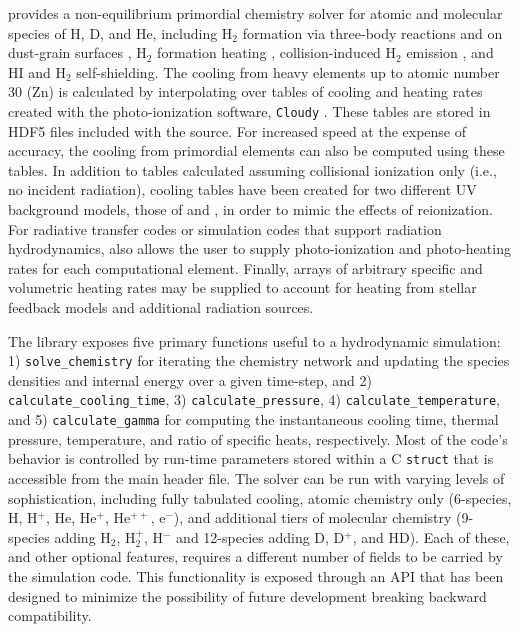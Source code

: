 \grackle{} provides a non-equilibrium primordial chemistry solver for
atomic and molecular species of H, D, and He, including H$_{2}$
formation via three-body reactions \citep{2002Sci...295...93A,
2011ApJ...726...55T} and on dust-grain surfaces
\citep{1979ApJS...41..555H, 2000ApJ...534..809O, 2014ApJ...783...75M},
H$_{2}$ formation 
heating \citep{2009Sci...325..601T}, collision-induced H$_{2}$
emission \citep{2004MNRAS.348.1019R}, and HI
\citep{2013MNRAS.430.2427R} and H$_{2}$ \citep{2012MNRAS.425L..51W}
self-shielding.  The cooling from heavy elements up to atomic number
30 (Zn) is calculated by interpolating over tables of cooling and
heating rates created with the photo-ionization software,
\texttt{Cloudy} \citep{2013RMxAA..49..137F}.  These
tables are stored in HDF5 files included with the source.  For
increased speed at the expense of accuracy, the cooling from
primordial elements can also be computed using these tables.  In
addition to tables calculated assuming collisional ionization only
(i.e., no incident radiation), cooling tables have been created for two
different UV background models, those of \citet{2009ApJ...703.1416F}
and \citet{2012ApJ...746..125H}, in order to mimic the effects of
reionization.  For radiative transfer codes or simulation codes that
support radiation hydrodynamics, \grackle{} also allows the user to supply
photo-ionization and photo-heating rates for each computational
element.  Finally, arrays of arbitrary specific and volumetric heating
rates may be supplied to account for heating from stellar feedback
models and additional radiation sources.

The \grackle{} library exposes five primary functions useful to a
hydrodynamic simulation: 1) \texttt{solve\_chemistry} for iterating
the chemistry network and updating the species densities and internal
energy over a given time-step, and 2)
\texttt{calculate\_cooling\_time}, 3) \texttt{calculate\_pressure}, 4)
\texttt{calculate\_temperature}, and 5) \texttt{calculate\_gamma} for
computing the instantaneous cooling time, thermal pressure,
temperature, and ratio of specific heats, respectively.  Most of the
code's behavior is controlled by run-time parameters stored within a C
\texttt{struct} that is accessible from the main \grackle{} header
file.  The solver can be run with varying levels of sophistication,
including fully tabulated cooling, atomic chemistry only (6-species,
H, H$^{+}$, He, He$^{+}$, He$^{++}$, e$^{-}$), and additional tiers of
molecular chemistry (9-species adding H$_{2}$, H$_{2}^{+}$, H$^{-}$
and 12-species adding D, D$^{+}$, and HD).  Each of these, and other
optional features, requires a different number of fields to be carried
by the simulation code.  This functionality is exposed through
an API that has been designed to minimize the possibility of future
development breaking backward compatibility.

